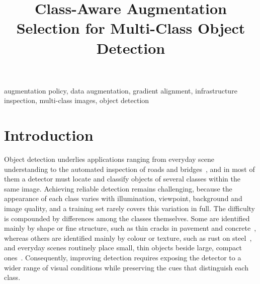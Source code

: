 \documentclass[conference]{IEEEtran}
\begin{document}
\title{Class-Aware Augmentation Selection for Multi-Class Object Detection}
\maketitle


\begin{IEEEkeywords}
augmentation policy, data augmentation, gradient alignment, infrastructure inspection, multi-class images, object detection
\end{IEEEkeywords}

\section{Introduction}
\label{sec:intro}

Object detection underlies applications ranging from everyday scene understanding to the automated inspection of roads and bridges~\cite{everingham2010voc,shang2024automated,vision2025inspection}, and in most of them a detector must locate and classify objects of several classes within the same image. Achieving reliable detection remains challenging, because the appearance of each class varies with illumination, viewpoint, background and image quality, and a training set rarely covers this variation in full. The difficulty is compounded by differences among the classes themselves. Some are identified mainly by shape or fine structure, such as thin cracks in pavement and concrete~\cite{arya2024rdd,flotzinger2024dacl10k}, whereas others are identified mainly by colour or texture, such as rust on steel~\cite{flotzinger2024dacl10k}, and everyday scenes routinely place small, thin objects beside large, compact ones~\cite{everingham2010voc}. Consequently, improving detection requires exposing the detector to a wider range of visual conditions while preserving the cues that distinguish each class.
\end{document}
